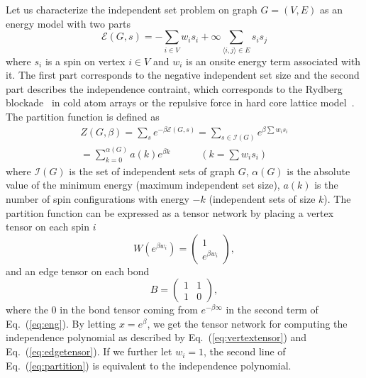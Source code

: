 \documentclass[onefignum, onetabnum]{siamart190516}
\newcommand{\<}{\langle}
\renewcommand{\>}{\rangle}
\newcommand{\Eq}[1]{Eq.~(\ref{#1})}
\begin{document}
Let us characterize the independent set problem on graph $G=(V, E)$ as an energy model with two parts
\begin{equation}\label{eq:eng}
    \mathcal{E}(G, s) = -\sum_{i\in V} w_i s_i + \infty \sum_{\langle i,j\rangle \in E}s_i s_j
\end{equation}
where $s_i$ is a spin on vertex $i \in V$ and $w_i$ is an onsite energy term associated with it.
The first part corresponds to the negative independent set size and the second part describes the independence contraint, which corresponds to the Rydberg blockade~\cite{Pichler2018, Ebadi2022} in cold atom arrays or the repulsive force in hard core lattice model~\cite{Dyre2016, Fernandes2007}.
The partition function is defined as
\begin{equation}\label{eq:partition}
    \begin{split}
    Z(G, \beta) = \sum_{s}e^{-\beta \mathcal{E}(G, s)} = \sum_{s\in \mathcal{I}(G)} e^{\beta \sum w_i s_i}\\
         = \sum_{k=0}^{\alpha(G)}a(k) e^{\beta k}  \qquad \quad (k = \sum w_i s_i)
    \end{split}
\end{equation}
where $\mathcal{I}(G)$ is the set of independent sets of graph $G$, $\alpha(G)$ is the absolute value of the minimum energy (maximum independent set size), $a(k)$ is the number of spin configurations with energy $-k$ (independent sets of size $k$).
The partition function can be expressed as a tensor network by placing a vertex tensor on each spin $i$
\begin{equation}
    W(e^{\beta w_i}) = \left(\begin{matrix}
        1 \\
        e^{\beta w_i}
    \end{matrix}\right),
\end{equation}
and an edge tensor on each bond
\begin{equation}
       B = \left(\begin{matrix}
        1  & 1\\
        1 & 0
    \end{matrix}\right),
\end{equation}
where the $0$ in the bond tensor coming from $e^{-\beta\infty}$ in the second term of \Eq{eq:eng}.
By letting $x = e^{\beta}$, we get the tensor network for computing the independence polynomial as described by \Eq{eq:vertextensor} and \Eq{eq:edgetensor}.
If we further let $w_i=1$, the second line of \Eq{eq:partition} is equivalent to the independence polynomial.
\end{document}
